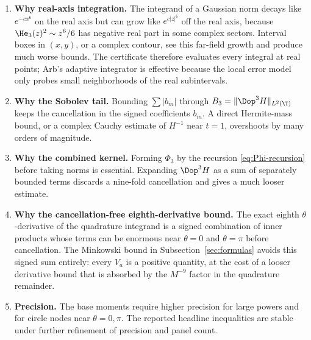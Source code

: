 \begin{enumerate}[label=\textbf{I\arabic*.},leftmargin=*]
\item \textbf{Why real-axis integration.}  The integrand of a Gaussian norm decays like $e^{-c x^6}$ on the real axis but can grow like $e^{c|z|^6}$ off the real axis, because $\He_3(z)^2\sim z^6/6$ has negative real part in some complex sectors.  Interval boxes in $(x,y)$, or a complex contour, see this far-field growth and produce much worse bounds.  The certificate therefore evaluates every integral at real points; Arb's adaptive integrator is effective because the local error model only probes small neighborhoods of the real subintervals.

\item \textbf{Why the Sobolev tail.}  Bounding $\sum|b_m|$ through $B_3=\|\Dop^3H\|_{L^2(\T)}$ keeps the cancellation in the signed coefficients $b_m$.  A direct Hermite-mass bound, or a complex Cauchy estimate of $H^{-1}$ near $t=1$, overshoots by many orders of magnitude.

\item \textbf{Why the combined kernel.}  Forming $\Phi_3$ by the recursion \eqref{eq:Phi-recursion} before taking norms is essential.  Expanding $\Dop^3H$ as a sum of separately bounded terms discards a nine-fold cancellation and gives a much looser estimate.

\item \textbf{Why the cancellation-free eighth-derivative bound.}  The exact eighth $\theta$-derivative of the quadrature integrand is a signed combination of inner products whose terms can be enormous near $\theta=0$ and $\theta=\pi$ before cancellation.  The Minkowski bound in Subsection~\ref{sec:formulas} avoids this signed sum entirely: every $V_a$ is a positive quantity, at the cost of a looser derivative bound that is absorbed by the $M^{-9}$ factor in the quadrature remainder.

\item \textbf{Precision.}  The base moments require higher precision for large powers and for circle nodes near $\theta=0,\pi$.  The reported headline inequalities are stable under further refinement of precision and panel count.
\end{enumerate}
